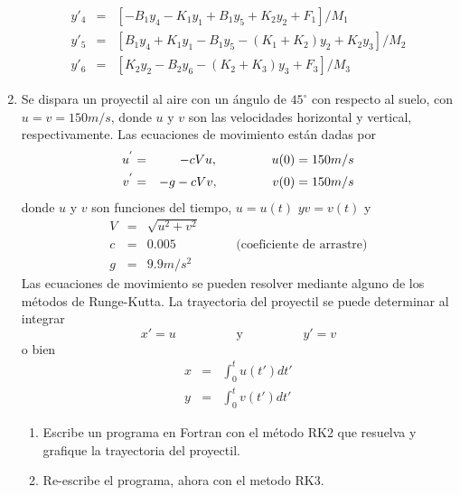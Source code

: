 \documentclass[letterpaper]{article}
\begin{document}
\begin{enumerate}
\begin{eqnarray}
y'_{4} & = & \left[ -B_{1} y_{4} - K_{1} y_{1} + B_{1} y_{5} + K_{2} y_{2} + F_{1} \right] / M_{1} \\
y'_{5} & = & \left[ B_{1} y_{4} + K_{1} y_{1} - B_{1} y_{5} - \left( K_{1} + K_{2} \right) y_{2} + K_{2} y_{3} \right] / M_{2}\\
y'_{6} & = & \left[ K_{2} y_{2} - B_{2} y_{6} - \left( K_{2} + K_{3} \right)y_{3} + F_{3} \right] / M_{3}
\end{eqnarray}
\item Se dispara un proyectil al aire con un ángulo de $45^{\circ}$ con respecto al suelo, con $u=v=150 m/s$, donde $u$ y $v$ son las velocidades horizontal y vertical, respectivamente. Las ecuaciones de movimiento están dadas por
\begin{eqnarray*}
u^{'} & = & -c Vu, \hspace{1.5cm} u(0)=150 m/s \\
v^{'} & = & -g - cVv, \hspace{1.5cm} v(0)=150 m/s
\end{eqnarray*}
donde $u$ y $v$ son funciones del tiempo, $u=u(t)$ $y v=v(t)$ y
\begin{eqnarray*}
V & = & \sqrt{u^{2} + v^{2}} \\
c & = & 0.005 \hspace{2cm} \text{(coeficiente de arrastre)} \\
g & = & 9.9 m/s^{2}
\end{eqnarray*}
Las ecuaciones de movimiento se pueden resolver mediante alguno de los métodos de Runge-Kutta. La trayectoria del proyectil se puede determinar al integrar
\[ x' = u \hspace{2cm} \text{y} \hspace{2cm} y' = v \]
o bien
\begin{eqnarray*}
x & = & \int^{t}_{0} u(t') dt' \\
y & = & \int^{t}_{0} v(t') dt'
\end{eqnarray*}
\begin{enumerate}
\item Escribe un programa en Fortran con el método RK2 que resuelva y grafique la trayectoria del proyectil.
\item Re-escribe el programa, ahora con el metodo RK3.
\end{enumerate}
\end{enumerate}
\end{document}
